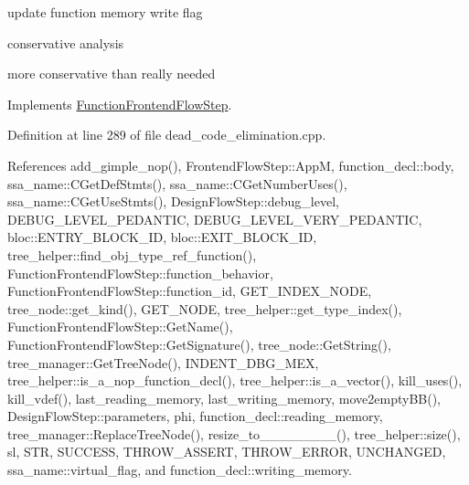 update function memory write flag

conservative analysis

more conservative than really needed 

Implements \hyperlink{classFunctionFrontendFlowStep_a00612f7fb9eabbbc8ee7e39d34e5ac68}{Function\+Frontend\+Flow\+Step}.



Definition at line 289 of file dead\+\_\+code\+\_\+elimination.\+cpp.



References add\+\_\+gimple\+\_\+nop(), Frontend\+Flow\+Step\+::\+AppM, function\+\_\+decl\+::body, ssa\+\_\+name\+::\+C\+Get\+Def\+Stmts(), ssa\+\_\+name\+::\+C\+Get\+Number\+Uses(), ssa\+\_\+name\+::\+C\+Get\+Use\+Stmts(), Design\+Flow\+Step\+::debug\+\_\+level, D\+E\+B\+U\+G\+\_\+\+L\+E\+V\+E\+L\+\_\+\+P\+E\+D\+A\+N\+T\+IC, D\+E\+B\+U\+G\+\_\+\+L\+E\+V\+E\+L\+\_\+\+V\+E\+R\+Y\+\_\+\+P\+E\+D\+A\+N\+T\+IC, bloc\+::\+E\+N\+T\+R\+Y\+\_\+\+B\+L\+O\+C\+K\+\_\+\+ID, bloc\+::\+E\+X\+I\+T\+\_\+\+B\+L\+O\+C\+K\+\_\+\+ID, tree\+\_\+helper\+::find\+\_\+obj\+\_\+type\+\_\+ref\+\_\+function(), Function\+Frontend\+Flow\+Step\+::function\+\_\+behavior, Function\+Frontend\+Flow\+Step\+::function\+\_\+id, G\+E\+T\+\_\+\+I\+N\+D\+E\+X\+\_\+\+N\+O\+DE, tree\+\_\+node\+::get\+\_\+kind(), G\+E\+T\+\_\+\+N\+O\+DE, tree\+\_\+helper\+::get\+\_\+type\+\_\+index(), Function\+Frontend\+Flow\+Step\+::\+Get\+Name(), Function\+Frontend\+Flow\+Step\+::\+Get\+Signature(), tree\+\_\+node\+::\+Get\+String(), tree\+\_\+manager\+::\+Get\+Tree\+Node(), I\+N\+D\+E\+N\+T\+\_\+\+D\+B\+G\+\_\+\+M\+EX, tree\+\_\+helper\+::is\+\_\+a\+\_\+nop\+\_\+function\+\_\+decl(), tree\+\_\+helper\+::is\+\_\+a\+\_\+vector(), kill\+\_\+uses(), kill\+\_\+vdef(), last\+\_\+reading\+\_\+memory, last\+\_\+writing\+\_\+memory, move2empty\+B\+B(), Design\+Flow\+Step\+::parameters, phi, function\+\_\+decl\+::reading\+\_\+memory, tree\+\_\+manager\+::\+Replace\+Tree\+Node(), resize\+\_\+to\+\_\+\_\+\_\+\_\+\_\+\_\+\_\+\_(), tree\+\_\+helper\+::size(), sl, S\+TR, S\+U\+C\+C\+E\+SS, T\+H\+R\+O\+W\+\_\+\+A\+S\+S\+E\+RT, T\+H\+R\+O\+W\+\_\+\+E\+R\+R\+OR, U\+N\+C\+H\+A\+N\+G\+ED, ssa\+\_\+name\+::virtual\+\_\+flag, and function\+\_\+decl\+::writing\+\_\+memory.

